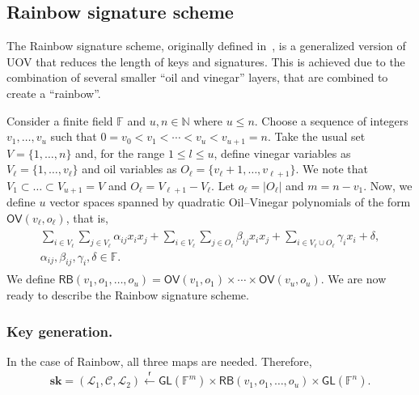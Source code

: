 \documentclass[draft, 12pt, a4paper, oneside]{memoir}
\newcommand{\random}{\overset{\mathsf{r}}{\gets}}
\theoremstyle{definition}
\begin{document}
\subsection{Rainbow signature scheme}\label{subsec:rainbow}

The Rainbow signature scheme, originally defined in~\cite{Ding:200506}, is a generalized version of UOV that reduces the length of keys and signatures. This is achieved due to the combination of several smaller ``oil and vinegar'' layers, that are combined to create a ``rainbow''.

Consider a finite field $\mathbb{F}$ and $u, n \in \mathbb{N}$ where $u \leq n$. Choose a sequence of integers $v_{1}, \dots, v_{u}$ such that $0 = v_{0} < v_{1} < \cdots < v_{u} < v_{u + 1} = n$. Take the usual set $V = \{1, \dots, n\}$ and, for the range $1 \leq l \leq u$, define vinegar variables as $V_{\ell} = \{1, \dots, v_{\ell}\}$ and oil variables as $O_{\ell} = \{v_{\ell} + 1, \dots, v_{\ell + 1}\}$. We note that $V_{1} \subset \dots \subset V_{u + 1} = V$ and $O_{\ell} = V_{\ell + 1} - V_{\ell}$. Let $o_{\ell} = |O_{\ell}|$ and $m = n - v_{1}$. Now, we define $u$ vector spaces spanned by quadratic Oil--Vinegar polynomials of the form $\mathsf{OV}(v_{\ell}, o_{\ell})$, that is,
\begin{align}\label{eq:ov}
  \begin{split}
    \sum_{i \in V_{\ell}} \sum_{j \in V_{\ell}} \alpha_{ij} x_{i} x_{j}
      + \sum_{i \in V_{\ell}} \sum_{j \in O_{\ell}} \beta_{ij} x_{i} x_{j}
      + \sum_{i \in V_{\ell} \cup O_{\ell}} \gamma_{i} x_{i} + \delta, \\
      \alpha_{ij}, \beta_{ij}, \gamma_{i}, \delta \in \mathbb{F}.
  \end{split}
\end{align}
We define $\mathsf{RB}(v_{1}, o_{1}, \dots, o_{u}) = \mathsf{OV}(v_{1}, o_{1}) \times \cdots \times \mathsf{OV}(v_{u}, o_{u})$. We are now ready to describe the Rainbow signature scheme.

\subsubsection{Key generation.}

In the case of Rainbow, all three maps are needed. Therefore,
\begin{align}
  \mathbf{sk} = (\mathcal{L}_{1}, \mathcal{C}, \mathcal{L}_{2}) 
    \random \mathsf{GL}(\mathbb{F}^{m}) \times \mathsf{RB}(v_{1}, o_{1}, \dots, o_{u}) \times \mathsf{GL}(\mathbb{F}^{n}).
\end{align}
\end{document}

